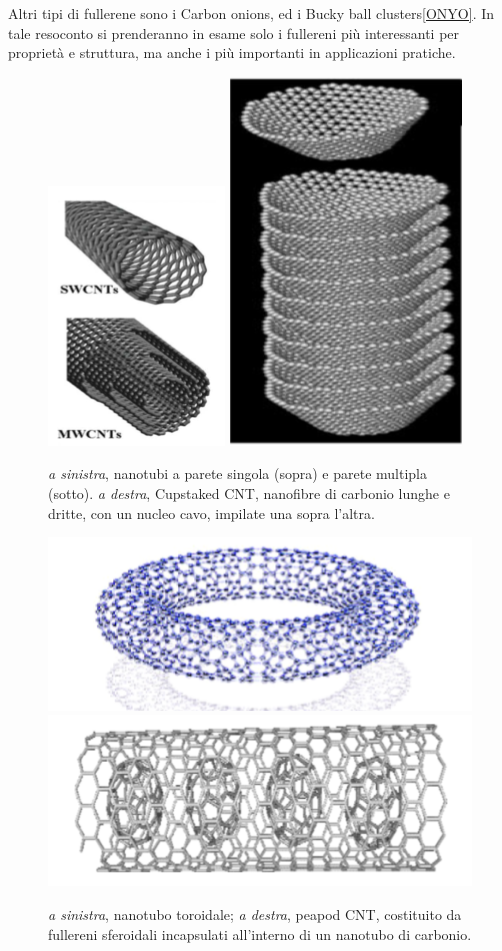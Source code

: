 \documentclass[a4paper,titlepage]{book}
\begin{document}
Altri tipi di fullerene sono i Carbon onions, ed i Bucky ball clusters\ref{ONYO}.
In tale resoconto si prenderanno in esame solo i fullereni più interessanti per proprietà e struttura, ma anche i più importanti in applicazioni pratiche. 
\begin{figure} [h!]
	\centering
	\includegraphics[width=.4\textwidth]{SWMW.png}\hfil
	\includegraphics[width=.4\textwidth]{cupstacked.png}
	
	\caption{\textit{a sinistra}, nanotubi a parete singola (sopra) e parete multipla (sotto). \textit{a destra},  Cupstaked CNT, nanofibre di carbonio lunghe e dritte, con un nucleo cavo, impilate una sopra l'altra.}\label{swmww}
\end{figure}
\begin{figure}[h!]
	\centering
	\includegraphics[width=.49\textwidth]{torus.png}\hfil
	\includegraphics[width=.49\textwidth]{peapod.png}
	
	\caption{\textit{a sinistra}, nanotubo toroidale; \textit{a destra}, peapod CNT, costituito da fullereni sferoidali incapsulati all'interno di un nanotubo di carbonio. }\label{pea}
\end{figure}
\end{document}
